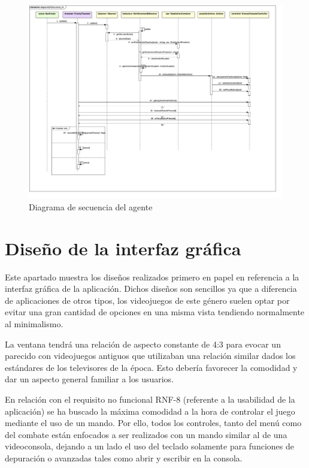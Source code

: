 \begin{figure}
	\centerline{\includegraphics[width=19cm]{otros/UML/png/alld/png/CasosDeUso__Especifico__Collaboration3__Interaction1__diagramaDeSecuencia_IA_19.png}}
	\caption{Diagrama de secuencia del agente}
	\label{sec:agent}
\end{figure}

\section{Diseño de la interfaz gráfica}

Este apartado muestra los diseños realizados primero en papel en referencia a la interfaz gráfica de la aplicación. Dichos diseños son sencillos ya que a diferencia de aplicaciones de otros tipos, los videojuegos de este género suelen optar por evitar una gran cantidad de opciones en una misma vista tendiendo normalmente al minimalismo.

\bigskip

La ventana tendrá una relación de aspecto constante de 4:3 para evocar un parecido con videojuegos antiguos que utilizaban una relación similar dados los estándares de los televisores de la época. Esto debería favorecer la comodidad y dar un aspecto general familiar a los usuarios.

\bigskip

En relación con el requisito no funcional RNF-8 (referente a la usabilidad de la aplicación) se ha buscado la máxima comodidad a la hora de controlar el juego mediante el uso de un mando. Por ello, todos los controles, tanto del menú como del combate están enfocados a ser realizados con un mando similar al de una videoconsola, dejando a un lado el uso del teclado solamente para funciones de depuración o avanzadas tales como abrir y escribir en la consola.

